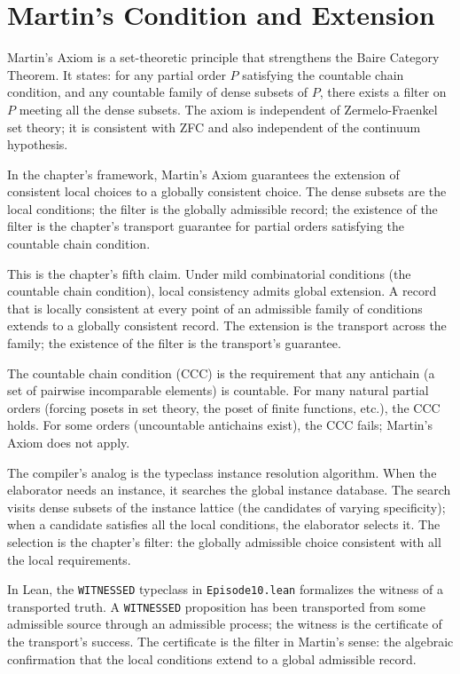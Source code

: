 \section{Martin's Condition and Extension}
\label{se:martins-condition-and-extension}

Martin's Axiom is a set-theoretic principle that strengthens the
Baire Category Theorem. It states: for any partial order $P$
satisfying the countable chain condition, and any countable
family of dense subsets of $P$, there exists a filter on $P$
meeting all the dense subsets. The axiom is independent of
Zermelo-Fraenkel set theory; it is consistent with ZFC and
also independent of the continuum hypothesis.

In the chapter's framework, Martin's Axiom guarantees the
extension of consistent local choices to a globally consistent
choice. The dense subsets are the local conditions; the filter is
the globally admissible record; the existence of the filter is
the chapter's transport guarantee for partial orders satisfying
the countable chain condition.

This is the chapter's fifth claim. Under mild combinatorial
conditions (the countable chain condition), local consistency
admits global extension. A record that is locally consistent at
every point of an admissible family of conditions extends to a
globally consistent record. The extension is the transport across
the family; the existence of the filter is the transport's
guarantee.

The countable chain condition (CCC) is the requirement that any
antichain (a set of pairwise incomparable elements) is countable.
For many natural partial orders (forcing posets in set theory,
the poset of finite functions, etc.), the CCC holds. For some
orders (uncountable antichains exist), the CCC fails; Martin's
Axiom does not apply.

The compiler's analog is the typeclass instance resolution
algorithm. When the elaborator needs an instance, it searches
the global instance database. The search visits dense subsets of
the instance lattice (the candidates of varying specificity);
when a candidate satisfies all the local conditions, the
elaborator selects it. The selection is the chapter's filter:
the globally admissible choice consistent with all the local
requirements.

In Lean, the \texttt{WITNESSED} typeclass in \texttt{Episode10.lean}
formalizes the witness of a transported truth. A
\texttt{WITNESSED} proposition has been transported from some
admissible source through an admissible process; the witness is
the certificate of the transport's success. The certificate is
the filter in Martin's sense: the algebraic confirmation that
the local conditions extend to a global admissible record.

